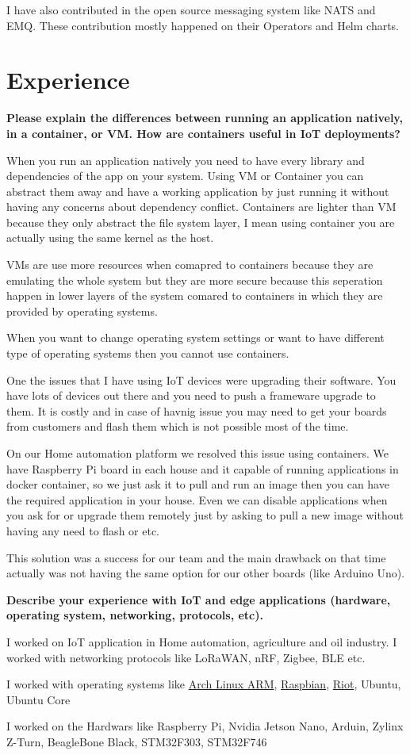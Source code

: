 I have also contributed in the open source messaging system like NATS and EMQ. These contribution mostly happened
on their Operators and Helm charts.

\section{Experience}

\textbf{Please explain the differences between running an application natively, in a container, or VM.
How are containers useful in IoT deployments?}

When you run an application natively you need to have every library and dependencies of the app on your system.
Using VM or Container you can abstract them away and have a working application by just running it without
having any concerns about dependency conflict.
Containers are lighter than VM because they only abstract the file system layer, I mean using container
you are actually using the same kernel as the host.

VMs are use more resources when comapred to containers because they are emulating the whole system but they are
more secure because this seperation happen in lower layers of the system comared to containers in which they
are provided by operating systems.

When you want to change operating system settings or want to have different type of operating systems then you cannot
use containers.

One the issues that I have using IoT devices were upgrading their software. You have lots of devices out there
and you need to push a frameware upgrade to them. It is costly and in case of havnig issue you may need to get
your boards from customers and flash them which is not possible most of the time.

On our Home automation platform we resolved this issue using containers. We have Raspberry Pi board in each house
and it capable of running applications in docker container, so we just ask it to pull and run an image then
you can have the required application in your house. Even we can disable applications when you ask for or upgrade
them remotely just by asking to pull a new image without having any need to flash or etc.

This solution was a success for our team and the main drawback on that time actually was not having the same
option for our other boards (like Arduino Uno).

\textbf{Describe your experience with IoT and edge applications (hardware, operating system, networking, protocols, etc).}

I worked on IoT application in Home automation, agriculture and oil industry. I worked with networking protocols
like LoRaWAN, nRF, Zigbee, BLE etc.

I worked with operating systems like \href{https://archlinuxarm.org/}{Arch Linux ARM}, \href{https://www.raspbian.org/}{Raspbian},
\href{https://www.riot-os.org/}{Riot}, Ubuntu, Ubuntu Core

I worked on the Hardwars like Raspberry Pi, Nvidia Jetson Nano, Arduin, Zylinx Z-Turn, BeagleBone Black,
STM32F303, STM32F746

